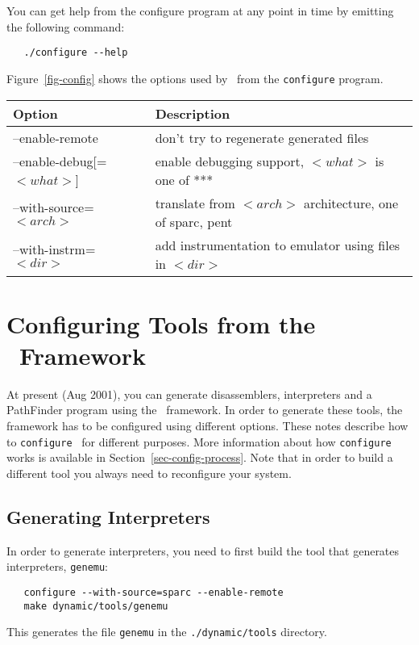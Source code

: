 You can get help from the configure program at any point in time by 
emitting the following command: 
\begin{verbatim}
   ./configure --help
\end{verbatim}

Figure~\ref{fig-config} shows the options used by \walk\ from the 
\verb!configure! program. 

\centerfigbegin
\begin{tabular}{|l|l|} \hline
Option 	& Description \\ \hline
  --enable-remote       & don't try to regenerate generated files \\
  --enable-debug[=$<what>$] & enable debugging support, $<what>$ is one of ***\\
  --with-source=$<arch>$  & translate from $<arch>$ architecture,
                          one of sparc, pent \\
  --with-instrm=$<dir>$   & add instrumentation to emulator using files in $<dir>$ \\  \hline
\end{tabular}


\section{Configuring Tools from the \walk\ Framework}
At present (Aug 2001), you can generate disassemblers, interpreters 
and a PathFinder program using the \walk\ framework. 
In order to generate these tools, the framework has to be configured
using different options.  These notes describe how to \texttt{configure} 
\walk\ for different purposes.  More information about how \texttt{configure} 
works is available in Section~\ref{sec-config-process}.  
Note that in order to build a different tool you always need to 
reconfigure your system. 


\subsection{Generating Interpreters}

In order to generate interpreters, you need to first build the tool
that generates interpreters, \texttt{genemu}: 

\begin{verbatim}
   configure --with-source=sparc --enable-remote
   make dynamic/tools/genemu
\end{verbatim}
This generates the file \texttt{genemu} in the \texttt{./dynamic/tools} 
directory. 


